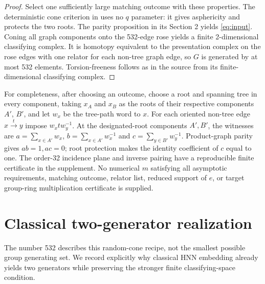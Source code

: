 \documentclass[11pt]{article}
\begin{document}
\begin{proof}
Select one sufficiently large matching outcome with these properties.
The deterministic cone criterion in \cite[Section 6]{OpenAI} uses no
$q$ parameter: it gives asphericity and protects the two roots.
The parity proposition in its Section 2 yields \eqref{eq:input}.
Coning all graph components onto the 532-edge rose yields a finite
2-dimensional classifying complex. It is homotopy equivalent to the
presentation complex on the rose edges with one relator for each
non-tree graph edge, so $G$ is generated by at most 532 elements.
Torsion-freeness follows as in the source from its finite-dimensional
classifying complex.
\end{proof}

For completeness, after choosing an outcome, choose a root and spanning
tree in every component, taking $x_A$ and $x_B$ as the roots of their
respective components $A'$, $B'$, and let $w_x$ be the tree-path word to $x$.
For each oriented non-tree edge $x\xrightarrow{t}y$ impose
$w_xtw_y^{-1}$. At the designated-root components $A',B'$, the witnesses
are $a=\sum_{x\in A'}w_x$, $b=\sum_{x\in A'}w_x^{-1}$ and
$c=\sum_{y\in B'}w_y^{-1}$. Product-graph parity gives $ab=1,ac=0$;
root protection makes the identity coefficient of $c$ equal to one.
The order-32 incidence plane and inverse pairing have a reproducible
finite certificate in the supplement. No numerical $m$ satisfying all
asymptotic requirements, matching outcome, relator list, reduced support
of $e$, or target group-ring multiplication certificate is supplied.

\section{Classical two-generator realization}\label{sec:embedding}
The number 532 describes this random-cone recipe, not the smallest
possible group generating set. We record explicitly why classical HNN
embedding \cite{HNN,Morozov} already yields two generators while
preserving the stronger finite classifying-space condition.
\end{document}
